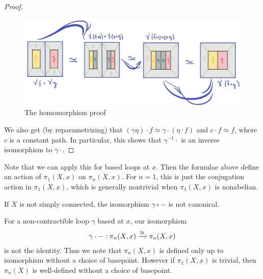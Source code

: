 \documentclass{article}[11pt]
\begin{document}
\begin{proof}
	\begin{figure}[h]
  \includegraphics[scale=.2]{pics/homotopybasept.png}
  \centering
  \caption{The homomorphism proof}
  \label{homotopybasept}
\end{figure}


We also get (by reparametrizing) that $(\gamma \eta)\cdot f \simeq \gamma\cdot (\eta\cdot f)$ and $c\cdot f \simeq f$, where $c$ is a constant path. In particular, this shows that $ \gamma^{-1}\cdot$ is an inverse isomorphism to $ \gamma\cdot $.
\end{proof}

\begin{note} Note that we can apply this for based loops at $x$. Then the formulae above define an action of $\pi_1(X,x)$ on $\pi_n(X,x)$. For $n=1$, this is just the conjugation action in $\pi_1(X,x)$, which is generally nontrivial when $\pi_1(X,x)$ is nonabelian.
\end{note}

\begin{note} If $X$ is not simply connected, the isomorphism $\gamma\circ -$ is not canonical.
\end{note}

\begin{note} For a non-contractible loop $\gamma$ based at $x$, our isomorphism
\begin{align*}
	\gamma\cdot- : \pi_n(X,x) \xrightarrow{\cong} \pi_n(X,x)
\end{align*}
is not the identity. Thus we note that $\pi_n(X,x)$ is defined only up to isomorphism without a choice of basepoint. However if $\pi_1(X,x)$ is trivial, then $\pi_n(X)$ is well-defined without a choice of basepoint.
\end{note}
\end{document}
